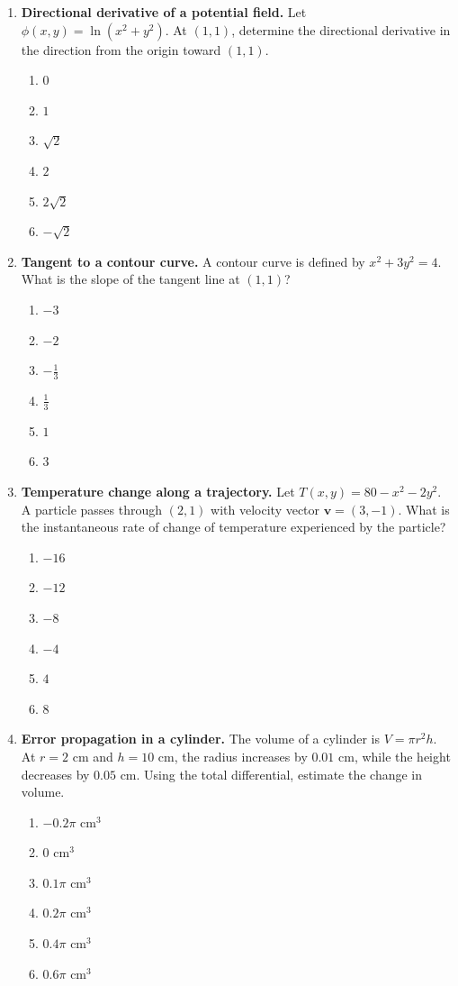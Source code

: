 \documentclass[a4paper,12pt]{article}
\theoremstyle{mystyle}
\numberwithin{equation}{section}
\numberwithin{theorem}{section}
\numberwithin{proposition}{section}
\numberwithin{example}{section}
\numberwithin{remark}{section}
\numberwithin{lemma}{section}
\numberwithin{corollary}{section}
\numberwithin{definition}{section}
\begin{document}
\begin{enumerate}[label=\textbf{Question \arabic*.},leftmargin=*]
\item \textbf{Directional derivative of a potential field.} Let $\phi(x,y)=\ln(x^2+y^2)$. At $(1,1)$, determine the directional derivative in the direction from the origin toward $(1,1)$.
\begin{enumerate}[label=(\Alph*)]
\item $0$
\item $1$
\item $\sqrt2$
\item $2$
\item $2\sqrt2$
\item $-\sqrt2$
\end{enumerate}

\item \textbf{Tangent to a contour curve.} A contour curve is defined by $x^2+3y^2=4$. What is the slope of the tangent line at $(1,1)$?
\begin{enumerate}[label=(\Alph*)]
\item $-3$
\item $-2$
\item $-\frac13$
\item $\frac13$
\item $1$
\item $3$
\end{enumerate}

\item \textbf{Temperature change along a trajectory.} Let $T(x,y)=80-x^2-2y^2$. A particle passes through $(2,1)$ with velocity vector $\mathbf v=(3,-1)$. What is the instantaneous rate of change of temperature experienced by the particle?
\begin{enumerate}[label=(\Alph*)]
\item $-16$
\item $-12$
\item $-8$
\item $-4$
\item $4$
\item $8$
\end{enumerate}

\item \textbf{Error propagation in a cylinder.} The volume of a cylinder is $V=\pi r^2h$. At $r=2$ cm and $h=10$ cm, the radius increases by $0.01$ cm, while the height decreases by $0.05$ cm. Using the total differential, estimate the change in volume.
\begin{enumerate}[label=(\Alph*)]
\item $-0.2\pi\text{ cm}^3$
\item $0\text{ cm}^3$
\item $0.1\pi\text{ cm}^3$
\item $0.2\pi\text{ cm}^3$
\item $0.4\pi\text{ cm}^3$
\item $0.6\pi\text{ cm}^3$
\end{enumerate}


\end{enumerate}
\end{document}
